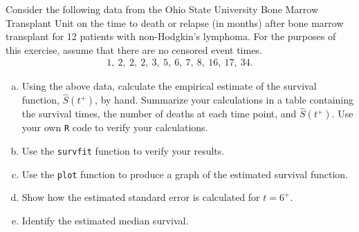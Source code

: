 Consider the following data from the Ohio State University Bone Marrow Transplant Unit
on the time to death or relapse (in months) after bone marrow transplant for 12 patients
with non-Hodgkin’s lymphoma. For the purposes of this exercise, assume that there are no
censored event times.
\begin{align}
1,\ 2,\ 2,\ 2,\ 3,\ 5,\ 6,\ 7,\ 8,\ 16,\ 17,\ 34. \nonumber
\end{align}

\begin{enumerate}[(a)]
 \item Using the above data, calculate the empirical estimate of the survival function,
 $\hat{S}(t^{+})$, by hand. Summarize your calculations in a table containing the survival times, the number of deaths at each time point, and $\hat{S}(t^{+})$. Use your own \verb!R! code to verify your calculations.
 \item Use the \verb|survfit| function to verify your results.
 \item Use the \verb|plot| function to produce a graph of the estimated survival function.
 \item Show how the estimated standard error is calculated for $t=6^{+}$.
 \item Identify the estimated median survival. 
\end{enumerate}